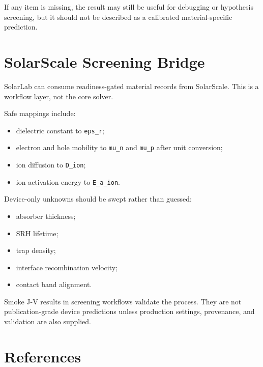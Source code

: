 \documentclass[
  11pt,
  american,
]{report}
\providecommand{\tightlist}{%
  \setlength{\itemsep}{0pt}\setlength{\parskip}{0pt}}
\begin{document}
If any item is missing, the result may still be useful for debugging or
hypothesis screening, but it should not be described as a calibrated
material-specific prediction.

\hypertarget{solarscale-screening-bridge}{%
\chapter{SolarScale Screening
Bridge}\label{solarscale-screening-bridge}}

SolarLab can consume readiness-gated material records from SolarScale.
This is a workflow layer, not the core solver.

Safe mappings include:

\begin{itemize}
\tightlist
\item
  dielectric constant to \texttt{eps\_r};
\item
  electron and hole mobility to \texttt{mu\_n} and \texttt{mu\_p} after
  unit conversion;
\item
  ion diffusion to \texttt{D\_ion};
\item
  ion activation energy to \texttt{E\_a\_ion}.
\end{itemize}

Device-only unknowns should be swept rather than guessed:

\begin{itemize}
\tightlist
\item
  absorber thickness;
\item
  SRH lifetime;
\item
  trap density;
\item
  interface recombination velocity;
\item
  contact band alignment.
\end{itemize}

Smoke J-V results in screening workflows validate the process. They are
not publication-grade device predictions unless production settings,
provenance, and validation are also supplied.

\hypertarget{references}{%
\chapter{References}\label{references}}
\end{document}
